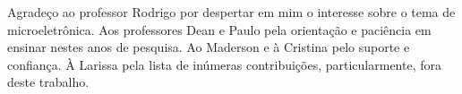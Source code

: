 \begin{agradecimentos}

Agradeço ao professor Rodrigo por despertar em mim o interesse sobre o tema de microeletrônica. Aos professores Dean e Paulo pela orientação e paciência em ensinar nestes anos de pesquisa. Ao Maderson e à Cristina pelo suporte e confiança. À Larissa pela lista de inúmeras contribuições, particularmente, fora deste trabalho. 


\end{agradecimentos}
